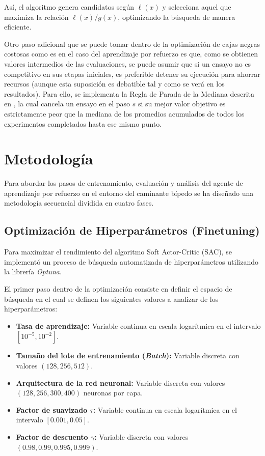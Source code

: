 \documentclass[11pt,a4paper]{article}
\begin{document}
	
	
	Así, el algoritmo genera candidatos según $\ell(x)$ y selecciona aquel que maximiza la relación $\ell(x)/g(x)$, optimizando la búsqueda de manera eficiente.
	\newline
	
	
	Otro paso adicional que se puede tomar dentro de la optimización de cajas negras costosas como es en el caso del aprendizaje por refuerzo es que, como se obtienen valores intermedios de las evaluaciones, se puede asumir que si un ensayo no es competitivo en sus etapas iniciales, es preferible detener su ejecución para ahorrar recursos (aunque esta suposición es debatible tal y como se verá en los resultados). Para ello, se implementa la Regla de Parada de la Mediana descrita en \cite{46180}, la cual cancela un ensayo en el paso $s$ si su mejor valor objetivo es estrictamente peor que la mediana de los promedios acumulados de todos los experimentos completados hasta ese mismo punto.
	
	\section{Metodología}
	Para abordar los pasos de entrenamiento, evaluación y análisis del agente de aprendizaje por refuerzo en el entorno del caminante bípedo se ha diseñado una metodología secuencial dividida en cuatro fases.
	
	\subsection{Optimización de Hiperparámetros (Finetuning)}
	Para maximizar el rendimiento del algoritmo Soft Actor-Critic (SAC), se implementó un proceso de búsqueda automatizada de hiperparámetros utilizando la librería \textit{Optuna}.
	\newline
	
	El primer paso dentro de la optimización consiste en definir el espacio de búsqueda en el cual se definen los siguientes valores a analizar de los hiperparámetros:
	\begin{itemize}
		\item \textbf{Tasa de aprendizaje:} Variable continua en escala logarítmica en el intervalo \([ 10^{-5}, 10^{-2}]\).
		\item \textbf{Tamaño del lote de entrenamiento (\textit{Batch}):} Variable discreta con valores \((128, 256, 512)\).
		\item \textbf{Arquitectura de la red neuronal:} Variable discreta con valores \((128, 256, 300, 400)\) neuronas por capa.
		\item \textbf{Factor de suavizado $\tau$:} Variable continua en escala logarítmica en el intervalo \([0.001,0.05]\).
		\item \textbf{Factor de descuento $\gamma$:} Variable discreta con valores \((0.98, 0.99, 0.995, 0.999)\).
	\end{itemize}
	
\end{document}
